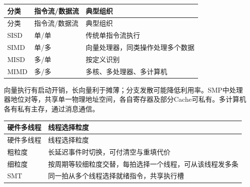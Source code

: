\par\smallskip
{\fontsize{9.3}{12}\selectfont\setlength{\tabcolsep}{2.5pt}\setlength{\LTleft}{0pt}\setlength{\LTright}{0pt}
\begin{longtable}{@{}>{\raggedright\arraybackslash}p{}>{\raggedright\arraybackslash}p{}>{\raggedright\arraybackslash}p{}@{}}
\toprule
分类 & 指令流/数据流 & 典型组织 \\

\midrule\endfirsthead\toprule
分类 & 指令流/数据流 & 典型组织 \\

\midrule\endhead\bottomrule\endfoot
SISD & 单/单 & 传统单指令流执行 \\

SIMD & 单/多 & 向量处理器，同类操作处理多个数据 \\

MISD & 多/单 & 按定义识别 \\

MIMD & 多/多 & 多核、多处理器、多计算机 \\

\end{longtable}}
\par\smallskip

向量执行有启动开销，长向量利于摊薄；分支发散可能降低利用率。SMP中处理器地位对等，共享单一物理地址空间，各自寄存器及部分Cache可私有。多计算机各有私有主存，通过消息通信。

\par\smallskip
{\fontsize{9.3}{12}\selectfont\setlength{\tabcolsep}{2.5pt}\setlength{\LTleft}{0pt}\setlength{\LTright}{0pt}
\begin{longtable}{@{}>{\raggedright\arraybackslash}p{}>{\raggedright\arraybackslash}p{}@{}}
\toprule
硬件多线程 & 线程选择粒度 \\

\midrule\endfirsthead\toprule
硬件多线程 & 线程选择粒度 \\

\midrule\endhead\bottomrule\endfoot
粗粒度 & 长延迟事件时切换，可付清空与重填代价 \\

细粒度 & 按周期等较细粒度交替，每拍选择一个线程，可从该线程发多条 \\

SMT & 同一拍从多个线程选择就绪指令，共享执行槽 \\

\end{longtable}}
\par\smallskip

